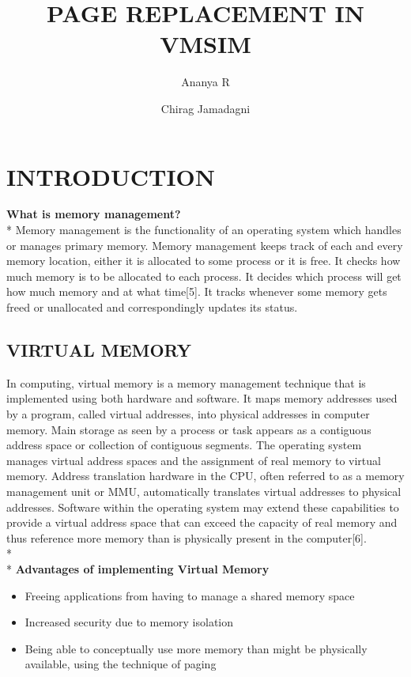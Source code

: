 \documentclass[12pt, oneside, a4paper]{report}
\title{PAGE REPLACEMENT IN VMSIM}
\author{Ananya R \and Chirag Jamadagni}
\begin{document}
\maketitle
\tableofcontents
\newpage

\section*{INTRODUCTION}
\textbf{What is memory management?}
\\*
Memory management is the functionality of an operating system which handles or manages primary memory. Memory management keeps track of each and every memory location, either it is allocated to some process or it is free. It checks how much memory is to be allocated to each process. It decides which process will get how much memory and at what time[5]. It tracks whenever some memory gets freed or unallocated and correspondingly updates its status.

\subsection*{VIRTUAL MEMORY}
In computing, virtual memory is a memory management technique that is implemented using both hardware and software. It maps memory addresses used by a program, called virtual addresses, into physical addresses in computer memory. Main storage as seen by a process or task appears as a contiguous address space or collection of contiguous segments. The operating system manages virtual address spaces and the assignment of real memory to virtual memory. Address translation hardware in the CPU, often referred to as a memory management unit or MMU, automatically translates virtual addresses to physical addresses. Software within the operating system may extend these capabilities to provide a virtual address space that can exceed the capacity of real memory and thus reference more memory than is physically present in the computer[6].
\\*
\\*
\textbf{Advantages of implementing Virtual Memory}
\begin{itemize}
\item Freeing applications from having to manage a shared memory space
\item Increased security due to memory isolation
\item Being able to conceptually use more memory than might be physically available, using the technique of paging
\end{itemize}
\newpage
\end{document}
